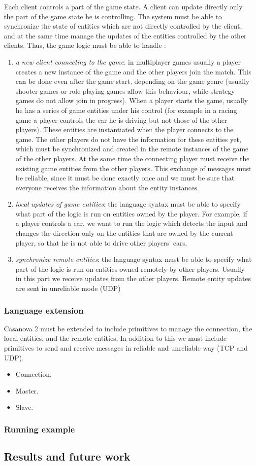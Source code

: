 Each client controls a part of the game state. A client can update directly only the part of the game state he is controlling. The system must be able to synchronize the state of entities which are not directly controlled by the client, and at the same time manage the updates of the entities controlled by the other clients. Thus, the game logic must be able to handle :
\begin{enumerate}
	\item \textit{a new client connecting to the game}: in multiplayer games usually a player creates a new instance of the game and the other players join the match. This can be done even after the game start, depending on the game genre (usually shooter games or role playing games allow this behaviour, while strategy games do not allow join in progress). When a player starts the game, usually he has a series of game entities under his control (for example in a racing game a player controls the car he is driving but not those of the other players). These entities are instantiated when the player connects to the game. The other players do not have the information for these entities yet, which must be synchronized and created in the remote instances of the game of the other players. At the same time the connecting player must receive the existing game entities from the other players. This exchange of messages must be reliable, since it must be done exactly once and we must be sure that everyone receives the information about the entity instances.
	\item \textit{local updates of game entities}: the language syntax must be able to specify what part of the logic is run on entities owned by the player. For example, if a player controls a car, we want to run the logic which detects the input and changes the direction only on the entities that are owned by the current player, so that he is not able to drive other players' cars.
	\item \textit{synchronize remote entities}: the language syntax must be able to specify what part of the logic is run on entities owned remotely by other players. Usually in this part we receive updates from the other players. Remote entity updates are sent in unreliable mode (UDP)
\end{enumerate}

\subsubsection{Language extension}
Casanova 2 must be extended to include primitives to manage the connection, the local entities, and the remote entities. In addition to this we must include primitives to send and receive messages in reliable and unreliable way (TCP and UDP).

\begin{itemize}
	\item Connection.
	\item Master.
	\item Slave.
\end{itemize}

\subsubsection{Running example}

\subsection{Results and future work}